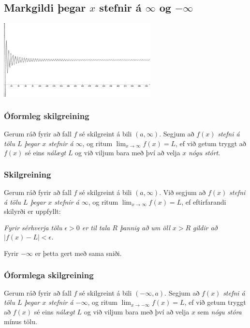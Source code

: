 \documentclass[icelandic,a4paper,12pt]{article}
\begin{document}
\subsection{Markgildi þegar $x$ stefnir á $\infty$ og $-\infty$}
\begin{center}
  \includegraphics[width=8cm,keepaspectratio=true]{./myndir/kafli01/03_liminf.png}
\end{center}
\pause
\subsubsection{Óformleg skilgreining}
Gerum ráð fyrir að fall $f$ sé
skilgreint á bili $(a, \infty)$.  Segjum að  $f(x)$
{\it stefni á tölu $L$ þegar $x$ stefnir á $\infty$}, og ritum
$\lim_{x\rightarrow \infty} f(x)=L$, ef við getum tryggt að  $f(x)$ sé eins
\emph{nálægt}
$L$ og við viljum bara með því að velja $x$ \emph{nógu stórt}.

\subsubsection{Skilgreining}
Gerum ráð fyrir að fall $f$ sé
skilgreint á bili $(a,\infty)$.  Við segjum að $f(x)$
{\it stefni á tölu $L$ þegar $x$ stefnir á $\infty$}, og ritum
$\lim_{x\rightarrow \infty} f(x)=L$, ef eftirfarandi skilyrði er uppfyllt:

{\it Fyrir sérhverja tölu $\epsilon>0$ er til tala $R$ þannig að um öll $x>R$ } 
\emph{gildir að  $|f(x)-L|<\epsilon$.}


Fyrir $-\infty$ er þetta gert með sama sniði.

\subsubsection{Óformlega skilgreining}
Gerum ráð fyrir að fall $f$ sé
skilgreint á bili $(-\infty, a)$.  Segjum að  $f(x)$
{\it stefni á tölu $L$ þegar $x$ stefnir á $-\infty$}, og ritum
$\lim_{x\rightarrow -\infty} f(x)=L$, ef við getum tryggt að  $f(x)$ sé eins
\emph{nálægt} $L$ og við viljum bara með því að velja $x$ sem \emph{nógu stóra} mínus tölu.
\end{document}
